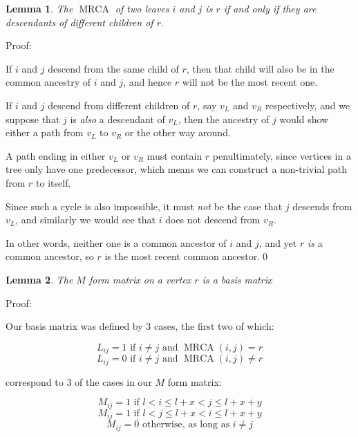 \documentclass[10pt,a4paper]{report}
\DeclareMathOperator{\MRCA}{MRCA}
\newtheorem{lemma}{Lemma}
\begin{document}
\begin{lemma} The $\MRCA$ of two leaves $i$ and $j$ is $r$ if and only if they
are descendants of different children of $r$.  \end{lemma}

Proof:

If $i$ and $j$ descend from the same child of $r$, then that child will also be
in the common ancestry of $i$ and $j$, and hence $r$ will not be the most
recent one.

If $i$ and $j$ descend from different children of $r$, say $v_L$ and $v_R$
respectively, and we suppose that $j$ is \emph{also} a descendant of $v_L$,
then the ancestry of $j$ would show either a path from $v_L$ to $v_R$ or the
other way around.

A path ending in either $v_L$ or $v_R$ must contain $r$ penultimately, since
vertices in a tree only have one predecessor, which means we can construct a
non-trivial path from $r$ to itself.

Since such a cycle is also impossible, it must \emph{not} be the case that $j$
descends from $v_L$, and similarly we would see that $i$ does not descend from
$v_R$.

In other words, neither one is a common ancestor of $i$ and $j$, and yet $r$
\emph{is} a common ancestor, so $r$ is the most recent common ancestor.\qed

\begin{lemma} The $M$ form matrix on a vertex $r$ is a basis matrix
\end{lemma}

Proof:

Our basis matrix was defined by 3 cases, the first two of which:

\begin{equation} \label{L_eqn_yes}
	L_{ij} = 1 \textrm{ if } i \neq j \textrm{ and } \MRCA(i, j) = r
\end{equation}
\begin{equation} \label{L_eqn_no}
	L_{ij} = 0 \textrm{ if } i \neq j \textrm{ and } \MRCA(i, j) \neq r
\end{equation}

correspond to 3 of the cases in our $M$ form matrix:

\begin{equation} \label{M_eqn_lr}
	M_{ij} = 1 \textrm{ if } l < i \leq l + x < j \leq l + x + y
\end{equation}
\begin{equation} \label{M_eqn_rl}
	M_{ij} = 1 \textrm{ if } l < j \leq l + x < i \leq l + x + y
\end{equation}
\begin{equation} \label{M_eqn_no}
	M_{ij} = 0 \textrm{ otherwise, as long as } i \neq j
\end{equation}
\end{document}
